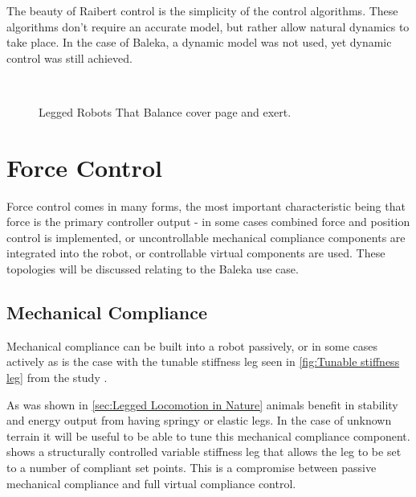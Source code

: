 The beauty of Raibert control is the simplicity of the control algorithms. These algorithms don't require an accurate model, but rather allow natural dynamics to take place. In the case of Baleka, a dynamic model was not used, yet dynamic control was still achieved.

\begin{figure}
\centering
{}
~
\caption{Legged Robots That Balance cover page and exert.\cite{Raibert1989}}
\end{figure}

\section{Force Control}
\label{sec:Force Control Lit}

Force control comes in many forms, the most important characteristic being that force is the primary controller output - in some cases combined force and position control is implemented, or uncontrollable mechanical compliance components are integrated into the robot, or controllable virtual components are used. These topologies will be discussed relating to the Baleka use case.

\subsection{Mechanical Compliance}

Mechanical compliance can be built into a robot passively, or in some cases actively as is the case with the tunable stiffness leg seen in \cref{fig:Tunable stiffness leg} from the study \cite{GallowayKevinCandClarkJonathanEandKoditschek2009}. 

As was shown in \cref{sec:Legged Locomotion in Nature} animals benefit in stability and energy output from having springy or elastic legs. In the case of unknown terrain it will be useful to be able to tune this mechanical compliance component.  shows a structurally controlled variable stiffness leg that allows the leg to be set to a number of compliant set points. This is a compromise between passive mechanical compliance and full virtual compliance control. 

